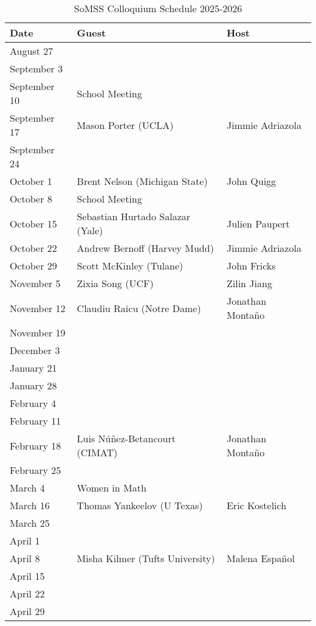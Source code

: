 \documentclass[11pt]{article}
\begin{document}
\begin{table}[htp]
\caption{SoMSS Colloquium Schedule 2025-2026}
\begin{center}
\begin{tabular}{|l|l|l|}
\hline
Date & Guest & Host\\
\hline
August 27 &&\\
September 3 &&\\
September 10 &School Meeting&\\
September 17 & Mason Porter (UCLA) & Jimmie Adriazola \\
September 24 &&\\
October 1 &Brent Nelson (Michigan State)& John Quigg \\
October 8 & School Meeting&\\
October 15 &Sebastian Hurtado Salazar (Yale)& Julien Paupert\\
October 22 & Andrew Bernoff (Harvey Mudd)& Jimmie Adriazola\\
October 29 &Scott McKinley (Tulane)& John Fricks\\
November 5 &Zixia Song (UCF)& Zilin Jiang\\
November 12 &Claudiu Raicu (Notre Dame)& Jonathan Monta\~no \\
November 19 && \\
December 3 && \\
January 21 && \\
January 28 &&\\
February 4 && \\
February 11 && \\
February 18 &Luis N\'u\~nez-Betancourt (CIMAT)& Jonathan Monta\~no \\
February 25 && \\
March 4 &Women in Math &\\
March 16 & Thomas Yankeelov (U Texas)& Eric Kostelich\\
March 25 && \\
April 1 && \\
April 8 &Misha Kilmer (Tufts University) & Malena Espa\~nol\\ 
April 15 && \\
April 22 && \\
April 29 && \\
\hline
\end{tabular}
\end{center}
\end{table}%
\end{document}
